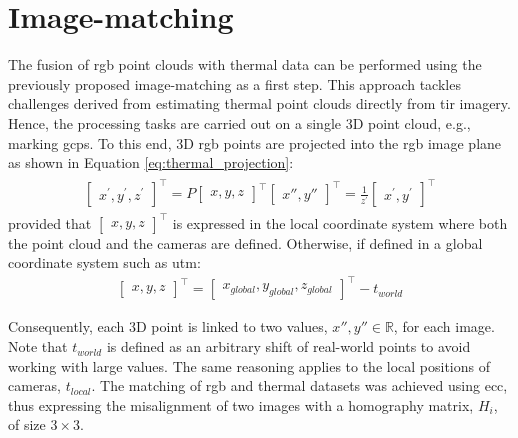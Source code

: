 \section{Image-matching}

The fusion of \acrshort{rgb} point clouds with thermal data can be performed using the previously proposed image-matching as a first step. This approach tackles challenges derived from estimating thermal point clouds directly from \acrshort{tir} imagery. Hence, the processing tasks are carried out on a single 3D point cloud, e.g., marking \acrshort{gcp}s. To this end, 3D \acrshort{rgb} points are projected into the \acrshort{rgb} image plane as shown in Equation \ref{eq:thermal_projection}:
\begin{gather}
    \label{eq:thermal_projection}
    \begin{aligned}
        \begin{bmatrix} x^\prime, y^\prime, z^\prime \end{bmatrix}^\intercal = P \begin{bmatrix} x, y, z\end{bmatrix}^\intercal
        \begin{bmatrix} x'', y'' \end{bmatrix}^\intercal = \frac{1}{z^\prime} \begin{bmatrix} x^\prime, y^\prime \end{bmatrix}^\intercal
    \end{aligned}
\end{gather}
provided that $\begin{bmatrix} x, y, z\end{bmatrix}^\intercal$ is expressed in the local coordinate system where both the point cloud and the cameras are defined. Otherwise, if defined in a global coordinate system such as \acrshort{utm}:
\begin{gather}
    \label{eq:thermal_projection_2}
    \begin{bmatrix} x, y, z \end{bmatrix}^\intercal = \begin{bmatrix} x_{\textit{global}}, y_{\textit{global}}, z_{\textit{global}} \end{bmatrix}^\intercal - t_{\textit{world}}
\end{gather}

Consequently, each 3D point is linked to two values, $x'', y'' \in \mathbb{R}$, for each image. Note that $t_{\textit{world}}$ is defined as an arbitrary shift of real-world points to avoid working with large values. The same reasoning applies to the local positions of cameras, $t_{\textit{local}}$. The matching of \acrshort{rgb} and thermal datasets was achieved using \acrshort{ecc}, thus expressing the misalignment of two images with a homography matrix, $H_i$, of size $3\times3$.

